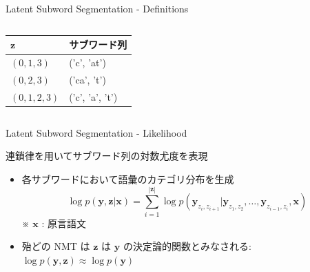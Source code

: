 \documentclass[unicode, 12pt, aspectratio=43]{beamer}
\begin{document}
\begin{frame}[label={sec:org652d584}]{Latent Subword Segmentation - Definitions}
\begin{columns}
\begin{column}{0.5\columnwidth}
\footnotesize

\begin{center}
\begin{tabular}{ll}
\toprule
\(\boldsymbol{z}\) & サブワード列\\
\midrule
\((0,1,3)\) & ('c', 'at')\\
\((0,2,3)\) & ('ca', 't')\\
\((0,1,2,3)\) & ('c', 'a', 't')\\
\bottomrule
\end{tabular}
\end{center}
\end{column}
\end{columns}
\end{frame}

\begin{frame}[label={sec:org1fb4d2c}]{Latent Subword Segmentation - Likelihood}
\begin{block}{連鎖律を用いてサブワード列の対数尤度を表現}
\begin{itemize}
\item 各サブワードにおいて語彙のカテゴリ分布を生成
\begin{equation*}
  \log p(\boldsymbol{y},\boldsymbol{z} | \boldsymbol{x}) = \sum_{i=1}^{|\boldsymbol{z}|} \log p(\boldsymbol{y}_{z_i, z_{i+1}} | \boldsymbol{y}_{z_1, z_2},\ldots,\boldsymbol{y}_{z_{i-1}, z_i}, \boldsymbol{x})
\end{equation*}
※ \(\boldsymbol{x}\) : 原言語文
\item 殆どの NMT は \(\boldsymbol{z}\) は \(\boldsymbol{y}\) の決定論的関数とみなされる: \(\log p(\boldsymbol{y}, \boldsymbol{z}) \approx \log p(\boldsymbol{y})\)
\end{itemize}
\end{block}
\end{frame}
\end{document}
